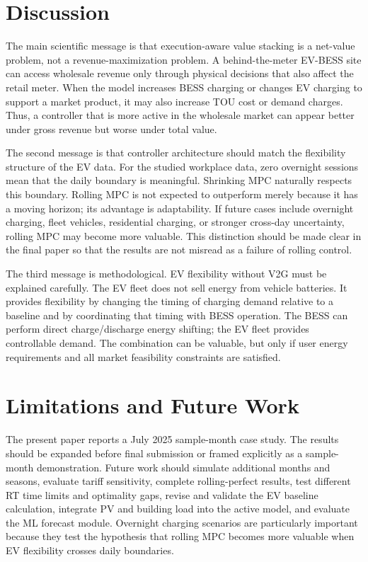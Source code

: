 \documentclass[final,5p,times]{elsarticle}
\begin{document}
\section{Discussion}
\label{sec:discussion}

The main scientific message is that execution-aware value stacking is a net-value problem, not a revenue-maximization problem. A behind-the-meter EV-BESS site can access wholesale revenue only through physical decisions that also affect the retail meter. When the model increases BESS charging or changes EV charging to support a market product, it may also increase TOU cost or demand charges. Thus, a controller that is more active in the wholesale market can appear better under gross revenue but worse under total value.

The second message is that controller architecture should match the flexibility structure of the EV data. For the studied workplace data, zero overnight sessions mean that the daily boundary is meaningful. Shrinking MPC naturally respects this boundary. Rolling MPC is not expected to outperform merely because it has a moving horizon; its advantage is adaptability. If future cases include overnight charging, fleet vehicles, residential charging, or stronger cross-day uncertainty, rolling MPC may become more valuable. This distinction should be made clear in the final paper so that the results are not misread as a failure of rolling control.

The third message is methodological. EV flexibility without V2G must be explained carefully. The EV fleet does not sell energy from vehicle batteries. It provides flexibility by changing the timing of charging demand relative to a baseline and by coordinating that timing with BESS operation. The BESS can perform direct charge/discharge energy shifting; the EV fleet provides controllable demand. The combination can be valuable, but only if user energy requirements and all market feasibility constraints are satisfied.

\section{Limitations and Future Work}
\label{sec:limitations}

The present paper reports a July 2025 sample-month case study. The results should be expanded before final submission or framed explicitly as a sample-month demonstration. Future work should simulate additional months and seasons, evaluate tariff sensitivity, complete rolling-perfect results, test different RT time limits and optimality gaps, revise and validate the EV baseline calculation, integrate PV and building load into the active model, and evaluate the ML forecast module. Overnight charging scenarios are particularly important because they test the hypothesis that rolling MPC becomes more valuable when EV flexibility crosses daily boundaries.
\end{document}
